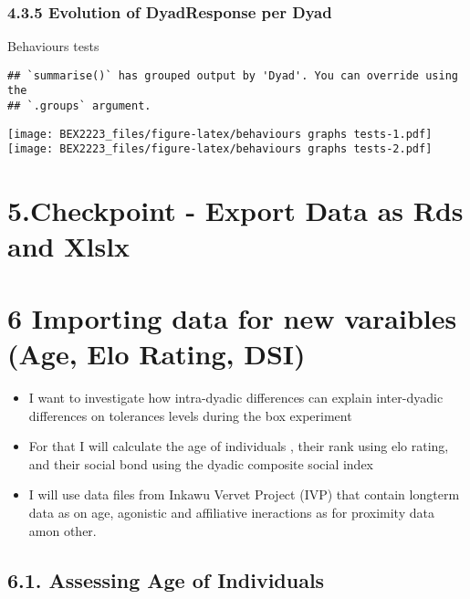 \documentclass[
]{article}
\providecommand{\tightlist}{%
  \setlength{\itemsep}{0pt}\setlength{\parskip}{0pt}}
\begin{document}
\hypertarget{evolution-of-dyadresponse-per-dyad}{%
\subsubsection{4.3.5 Evolution of DyadResponse per
Dyad}\label{evolution-of-dyadresponse-per-dyad}}

Behaviours tests

\begin{verbatim}
## `summarise()` has grouped output by 'Dyad'. You can override using the
## `.groups` argument.
\end{verbatim}

\texttt{[image: BEX2223\_files/figure-latex/behaviours graphs tests-1.pdf]}
\texttt{[image: BEX2223\_files/figure-latex/behaviours graphs tests-2.pdf]}

\hypertarget{checkpoint---export-data-as-rds-and-xlslx}{%
\section{5.Checkpoint - Export Data as Rds and
Xlslx}\label{checkpoint---export-data-as-rds-and-xlslx}}

\hypertarget{importing-data-for-new-varaibles-age-elo-rating-dsi}{%
\section{6 Importing data for new varaibles (Age, Elo Rating,
DSI)}\label{importing-data-for-new-varaibles-age-elo-rating-dsi}}

\begin{itemize}
\tightlist
\item
  I want to investigate how intra-dyadic differences can explain
  inter-dyadic differences on tolerances levels during the box
  experiment
\item
  For that I will calculate the age of individuals , their rank using
  elo rating, and their social bond using the dyadic composite social
  index
\item
  I will use data files from Inkawu Vervet Project (IVP) that contain
  longterm data as on age, agonistic and affiliative ineractions as for
  proximity data amon other.
\end{itemize}

\hypertarget{assessing-age-of-individuals}{%
\subsection{6.1. Assessing Age of
Individuals}\label{assessing-age-of-individuals}}
\end{document}

